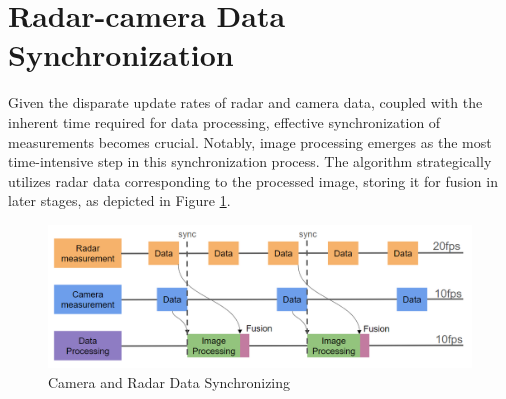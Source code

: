 \section{Radar-camera Data Synchronization}\label{sec:2-sync}
Given the disparate update rates of radar and camera data, 
coupled with the inherent time required for data processing, 
effective synchronization of measurements becomes crucial. 
Notably, image processing emerges as the most time-intensive step in this synchronization process. 
The algorithm strategically utilizes radar data corresponding to the processed image, storing it for fusion in later stages, 
as depicted in Figure \ref{fig:sync_radar_cam}.
\begin{figure}[hpbt]
    \centering
    \includegraphics[width=\textwidth]{Figures/syncing.png}%
    \caption{Camera and Radar Data Synchronizing}
    \label{fig:sync_radar_cam}
\end{figure}



